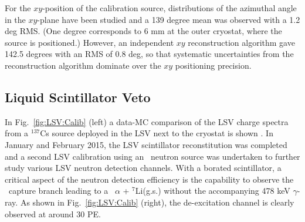 For the $xy$-position of the calibration source, distributions of the azimuthal angle in the $xy$-plane have been studied and a 139 degree mean was observed with a 1.2 deg RMS. (One degree corresponds to 6 mm at the outer cryostat, where the source is positioned.) However, an independent $xy$ reconstruction algorithm gave 142.5 degrees with an RMS of 0.8 deg, so that systematic uncertainties from the reconstruction algorithm dominate over the $xy$ positioning precision. %



\subsection{Liquid Scintillator Veto}\label{sec:LSV:gammasources}

In Fig.~\ref{fig:LSV:Calib} (left) a data-MC comparison of the LSV charge spectra from a $^{137}$Cs source deployed in the LSV next to the cryostat is shown \cite{DS50:G4DS:paper}.
In January and February 2015, the LSV scintillator reconstitution was completed and a second LSV calibration using an \AmBe\ neutron source was undertaken to further study various LSV neutron detection channels. With a borated scintillator, a critical aspect of the neutron detection efficiency is the capability to observe the \brbortenground\ capture branch leading to a \enbortengroundalpha\ $\alpha$ + $^7$Li(g.s.) without the accompanying 478 keV $\gamma$-ray. As shown in Fig.~\ref{fig:LSV:Calib} (right), the de-excitation channel is clearly observed at around 30 PE.

